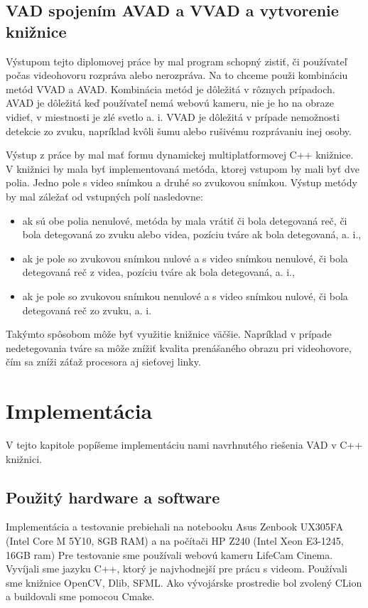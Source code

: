 \section{VAD spojením AVAD a VVAD a vytvorenie knižnice}
Výstupom tejto diplomovej práce by mal program schopný zistiť, či používateľ počas videohovoru rozpráva alebo nerozpráva. 
Na to chceme použi kombináciu metód VVAD a AVAD. 
Kombinácia metód je dôležitá v rôznych prípadoch. 
AVAD je dôležitá keď používateľ nemá webovú kameru, nie je ho na obraze vidieť, v miestnosti je zlé svetlo a. i.
VVAD je dôležitá v prípade nemožnosti detekcie zo zvuku, napríklad kvôli šumu alebo rušivému rozprávaniu inej osoby.

Výstup z práce by mal mať formu dynamickej multiplatformovej C++ knižnice. 
V knižnici by mala byť implementovaná metóda, ktorej vstupom by mali byť dve polia. 
Jedno pole s video snímkou a druhé so zvukovou snímkou.
Výstup metódy by mal záležať od vstupných polí nasledovne:
\begin{itemize}
	\item ak sú obe polia nenulové, metóda by mala vrátiť či bola detegovaná reč, či bola detegovaná zo zvuku alebo videa, pozíciu tváre ak bola detegovaná, a. i., 
	\item ak je pole so zvukovou snímkou nulové a s video snímkou nenulové, či bola detegovaná reč z videa, pozíciu tváre ak bola detegovaná, a. i.,
	\item ak je pole so zvukovou snímkou nenulové a s video snímkou nulové, či bola detegovaná reč zo zvuku, a. i.
\end{itemize}
Takýmto spôsobom môže byť využitie knižnice väčšie.
Napríklad v prípade nedetegovania tváre sa môže znížiť kvalita prenášaného obrazu pri videohovore, čím sa zníži záťaž procesora aj sieťovej linky.

\chapter{Implementácia}
V tejto kapitole popíšeme implementáciu nami navrhnutého riešenia VAD v C++ knižnici.

\section{Použitý hardware a software}
Implementácia a testovanie prebiehali na notebooku Asus Zenbook UX305FA (Intel Core M 5Y10, 8GB RAM) a na počítači HP Z240 (Intel Xeon E3-1245, 16GB ram)
Pre testovanie sme používali webovú kameru LifeCam Cinema.
Vyvíjali sme jazyku C++, ktorý je najvhodnejší pre prácu s videom.
Používali sme knižnice OpenCV, Dlib, SFML.
Ako vývojárske prostredie bol zvolený CLion a buildovali sme pomocou Cmake.


